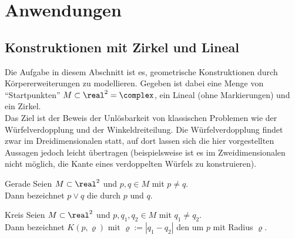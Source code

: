 \chapter{%
    Anwendungen%
}

\section{%
    Konstruktionen mit Zirkel und Lineal%
}

\begin{Bem}
    Die Aufgabe in diesem Abschnitt ist es,
    geometrische Konstruktionen durch Körpererweiterungen zu modellieren.
    Gegeben ist dabei eine Menge von "`Startpunkten"'
    $M \subset \real^2 = \complex$, ein Lineal (ohne Markierungen) und
    ein Zirkel.\\
    Das Ziel ist der Beweis der Unlösbarkeit von klassischen Problemen
    wie der Würfelverdopplung und der Winkeldreiteilung.
    Die Würfelverdopplung findet zwar im Dreidimensionalen statt, auf dort
    lassen sich die hier vorgestellten Aussagen jedoch leicht übertragen
    (beispielsweise ist es im Zweidimensionalen nicht möglich, die Kante
    eines verdoppelten Würfels zu konstruieren).
\end{Bem}

\linie

\begin{Def}{Gerade}
    Seien $M \subset \real^2$ und $p, q \in M$ mit $p \not= q$.\\
    Dann bezeichnet $p \lor q$ die  durch $p$ und $q$.
\end{Def}

\begin{Def}{Kreis}
    Seien $M \subset \real^2$ und $p, q_1, q_2 \in M$ mit $q_1 \not= q_2$.\\
    Dann bezeichnet $K(p, \varrho)$ mit $\varrho := |q_1 - q_2|$
    den  um $p$ mit Radius $\varrho$.
\end{Def}

